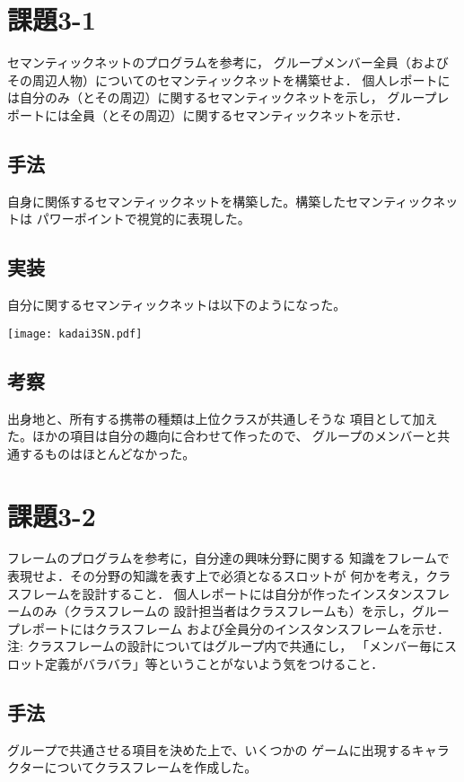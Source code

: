 \documentclass{jarticle}
\begin{document}
\section{課題3-1}
\begin{screen}
    セマンティックネットのプログラムを参考に，
    グループメンバー全員（およびその周辺人物）についてのセマンティックネットを構築せよ．
    個人レポートには自分のみ（とその周辺）に関するセマンティックネットを示し，
    グループレポートには全員（とその周辺）に関するセマンティックネットを示せ．
\end{screen}
\subsection{手法}
    自身に関係するセマンティックネットを構築した。構築したセマンティックネットは
    パワーポイントで視覚的に表現した。
\subsection{実装}
    自分に関するセマンティックネットは以下のようになった。
\begin{center}
    \texttt{[image: kadai3SN.pdf]}
\end{center}
\subsection{考察}
    出身地と、所有する携帯の種類は上位クラスが共通しそうな
    項目として加えた。ほかの項目は自分の趣向に合わせて作ったので、
    グループのメンバーと共通するものはほとんどなかった。

\section{課題3-2}
\begin{screen}
    フレームのプログラムを参考に，自分達の興味分野に関する
    知識をフレームで表現せよ．その分野の知識を表す上で必須となるスロットが
    何かを考え，クラスフレームを設計すること．
    個人レポートには自分が作ったインスタンスフレームのみ（クラスフレームの
    設計担当者はクラスフレームも）を示し，グループレポートにはクラスフレーム
    および全員分のインスタンスフレームを示せ．
    \\ 注: クラスフレームの設計についてはグループ内で共通にし，
    「メンバー毎にスロット定義がバラバラ」等ということがないよう気をつけること．
\end{screen}
\subsection{手法}
    グループで共通させる項目を決めた上で、いくつかの
    ゲームに出現するキャラクターについてクラスフレームを作成した。
\end{document}
